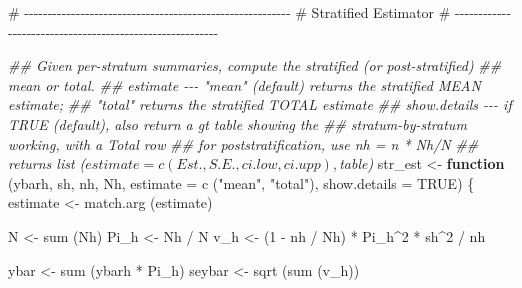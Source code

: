 \documentclass[
  letterpaper,
  DIV=11,
  numbers=noendperiod]{scrreprt}
\newenvironment{Shaded}{\begin{snugshade}}{\end{snugshade}}
\newcommand{\AttributeTok}[1]{\textcolor[rgb]{0.40,0.45,0.13}{#1}}
\newcommand{\CommentTok}[1]{\textcolor[rgb]{0.37,0.37,0.37}{#1}}
\newcommand{\ConstantTok}[1]{\textcolor[rgb]{0.56,0.35,0.01}{#1}}
\newcommand{\ControlFlowTok}[1]{\textcolor[rgb]{0.00,0.23,0.31}{\textbf{#1}}}
\newcommand{\DecValTok}[1]{\textcolor[rgb]{0.68,0.00,0.00}{#1}}
\newcommand{\DocumentationTok}[1]{\textcolor[rgb]{0.37,0.37,0.37}{\textit{#1}}}
\newcommand{\FunctionTok}[1]{\textcolor[rgb]{0.28,0.35,0.67}{#1}}
\newcommand{\NormalTok}[1]{\textcolor[rgb]{0.00,0.23,0.31}{#1}}
\newcommand{\OtherTok}[1]{\textcolor[rgb]{0.00,0.23,0.31}{#1}}
\newcommand{\SpecialCharTok}[1]{\textcolor[rgb]{0.37,0.37,0.37}{#1}}
\newcommand{\StringTok}[1]{\textcolor[rgb]{0.13,0.47,0.30}{#1}}
\renewcommand{\[}{\begin{equation}}
\renewcommand{\]}{\end{equation}}
\begin{document}
\begin{Shaded}
\begin{Highlighting}[]
\CommentTok{\# {-}{-}{-}{-}{-}{-}{-}{-}{-}{-}{-}{-}{-}{-}{-}{-}{-}{-}{-}{-}{-}{-}{-}{-}{-}{-}{-}{-}{-}{-}{-}{-}{-}{-}{-}{-}{-}{-}{-}{-}{-}{-}{-}{-}{-}{-}{-}{-}{-}{-}{-}{-}{-}{-}{-}{-}{-}}
\CommentTok{\# Stratified Estimator}
\CommentTok{\# {-}{-}{-}{-}{-}{-}{-}{-}{-}{-}{-}{-}{-}{-}{-}{-}{-}{-}{-}{-}{-}{-}{-}{-}{-}{-}{-}{-}{-}{-}{-}{-}{-}{-}{-}{-}{-}{-}{-}{-}{-}{-}{-}{-}{-}{-}{-}{-}{-}{-}{-}{-}{-}{-}{-}{-}{-}}

\DocumentationTok{\#\# Given per{-}stratum summaries, compute the stratified (or post{-}stratified)}
\DocumentationTok{\#\# mean or total.}
\DocumentationTok{\#\# estimate {-}{-}{-} "mean" (default) returns the stratified MEAN estimate;}
\DocumentationTok{\#\#              "total" returns the stratified TOTAL estimate}
\DocumentationTok{\#\# show.details {-}{-}{-} if TRUE (default), also return a gt table showing the}
\DocumentationTok{\#\#                  stratum{-}by{-}stratum working, with a Total row}
\DocumentationTok{\#\# for poststratification, use nh = n * Nh/N}
\DocumentationTok{\#\# returns list ($estimate = c(Est., S.E., ci.low, ci.upp), $table)}
\NormalTok{str\_est }\OtherTok{\textless{}{-}} \ControlFlowTok{function}\NormalTok{ (ybarh, sh, nh, Nh, }\AttributeTok{estimate =} \FunctionTok{c}\NormalTok{ (}\StringTok{"mean"}\NormalTok{, }\StringTok{"total"}\NormalTok{), }\AttributeTok{show.details =} \ConstantTok{TRUE}\NormalTok{)}
\NormalTok{\{}
\NormalTok{    estimate }\OtherTok{\textless{}{-}} \FunctionTok{match.arg}\NormalTok{ (estimate)}

\NormalTok{    N    }\OtherTok{\textless{}{-}} \FunctionTok{sum}\NormalTok{ (Nh)}
\NormalTok{    Pi\_h }\OtherTok{\textless{}{-}}\NormalTok{ Nh }\SpecialCharTok{/}\NormalTok{ N}
\NormalTok{    v\_h  }\OtherTok{\textless{}{-}}\NormalTok{ (}\DecValTok{1} \SpecialCharTok{{-}}\NormalTok{ nh }\SpecialCharTok{/}\NormalTok{ Nh) }\SpecialCharTok{*}\NormalTok{ Pi\_h}\SpecialCharTok{\^{}}\DecValTok{2} \SpecialCharTok{*}\NormalTok{ sh}\SpecialCharTok{\^{}}\DecValTok{2} \SpecialCharTok{/}\NormalTok{ nh}

\NormalTok{    ybar   }\OtherTok{\textless{}{-}} \FunctionTok{sum}\NormalTok{ (ybarh }\SpecialCharTok{*}\NormalTok{ Pi\_h)}
\NormalTok{    seybar }\OtherTok{\textless{}{-}} \FunctionTok{sqrt}\NormalTok{ (}\FunctionTok{sum}\NormalTok{ (v\_h))}


\end{Highlighting}
\end{Shaded}
\end{document}
